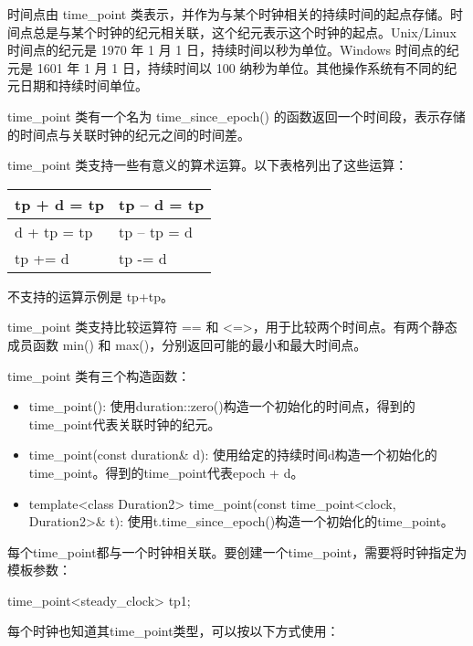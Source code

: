 
时间点由 time\_point 类表示，并作为与某个时钟相关的持续时间的起点存储。时间点总是与某个时钟的纪元相关联，这个纪元表示这个时钟的起点。Unix/Linux 时间点的纪元是 1970 年 1 月 1 日，持续时间以秒为单位。Windows 时间点的纪元是 1601 年 1 月 1 日，持续时间以 100 纳秒为单位。其他操作系统有不同的纪元日期和持续时间单位。

time\_point 类有一个名为 time\_since\_epoch() 的函数返回一个时间段，表示存储的时间点与关联时钟的纪元之间的时间差。

time\_point 类支持一些有意义的算术运算。以下表格列出了这些运算：

\begin{longtable}{|l|l|}
\hline
tp + d = tp & tp – d = tp \\ \hline
\endfirsthead
%
\endhead
%
d + tp = tp & tp – tp = d \\ \hline
tp += d     & tp -= d     \\ \hline
\end{longtable}

不支持的运算示例是 tp+tp。

time\_point 类支持比较运算符 == 和 <=>，用于比较两个时间点。有两个静态成员函数 min() 和 max()，分别返回可能的最小和最大时间点。

time\_point 类有三个构造函数：

\begin{itemize}
\item
time\_point(): 使用duration::zero()构造一个初始化的时间点，得到的time\_point代表关联时钟的纪元。

\item
time\_point(const duration\& d): 使用给定的持续时间d构造一个初始化的time\_point。得到的time\_point代表epoch + d。

\item
template<class Duration2> time\_point(const time\_point<clock, Duration2>\& t): 使用t.time\_since\_epoch()构造一个初始化的time\_point。
\end{itemize}

每个time\_point都与一个时钟相关联。要创建一个time\_point，需要将时钟指定为模板参数：

\begin{cpp}
time_point<steady_clock> tp1;
\end{cpp}

每个时钟也知道其time\_point类型，可以按以下方式使用：

